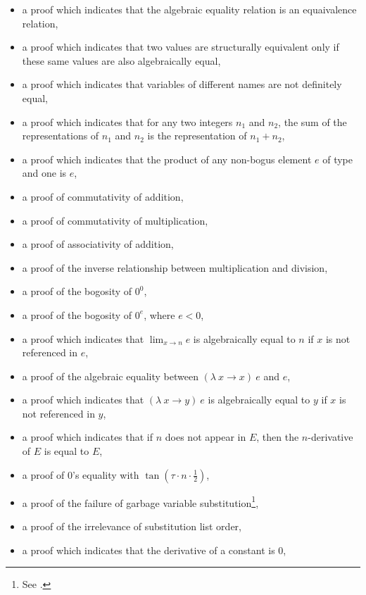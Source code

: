 \documentclass{report}
\begin{document}
\begin{itemize}
 \item a proof which indicates that the algebraic equality relation is an equaivalence relation,
 \item a proof which indicates that two values are structurally equivalent only if these same values are also algebraically equal,
 \item a proof which indicates that variables of different names are not definitely equal,
 \item a proof which indicates that for any two integers \(n_1\) and \(n_2\), the sum of the representations of \(n_1\) and \(n_2\) is the representation of \(n_1 + n_2\),
 \item a proof which indicates that the product of any non-bogus element \(e\) of type  and one is \(e\),
 \item a proof of commutativity of addition,
 \item a proof of commutativity of multiplication,
 \item a proof of associativity of addition,
 \item a proof of the inverse relationship between multiplication and division,
 \item a proof of the bogosity of \(0^0\),
 \item a proof of the bogosity of \(0^e\), where \(e < 0\),
 \item a proof which indicates that \(\lim_{x \rightarrow n} e\) is algebraically equal to \(n\) if \(x\) is not referenced in \(e\),
 \item a proof of the algebraic equality between \(\left(\lambda\ x \rightarrow x\right)\ e\) and \(e\),
 \item a proof which indicates that \(\left(\lambda\ x \rightarrow y\right)\ e\) is algebraically equal to \(y\) if \(x\) is not referenced in \(y\),
 \item a proof which indicates that if \(n\) does not appear in \(E\), then the \(n\)-derivative of \(E\) is equal to \(E\),
 \item a proof of \(0\)'s equality with \(\tan \left(\tau \cdot n \cdot \frac12\right)\),
 \item a proof of the failure of garbage variable substitution\footnote{See .},
 \item a proof of the irrelevance of substitution list order,
 \item a proof which indicates that the derivative of a constant is \(0\),

\end{itemize}
\end{document}
